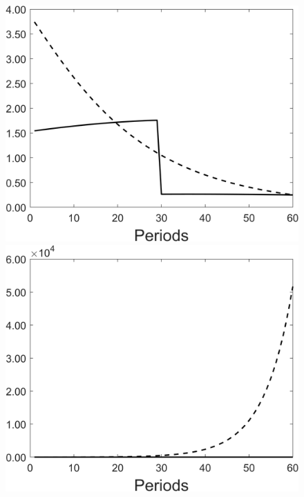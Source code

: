 \begin{figure}[h!!]
\begin{minipage}[]{0.32\textwidth}
	\end{minipage}
	\begin{minipage}[]{0.32\textwidth}
		\includegraphics[width=1\textwidth]{../codding_model/Own/figures/Rep_agent/staticRam_LF_separate_xc_periods59_eppsilon0.40_zeta1.40_Ad08_Ac04_thetac0.70_thetad0.56_HetGrowth1_tauul0.181_util0_withtarget1_lgd0.png}
	\end{minipage}
	\begin{minipage}[]{0.32\textwidth}
		\includegraphics[width=1\textwidth]{../codding_model/Own/figures/Rep_agent/staticRam_LF_separate_ydyc_periods59_eppsilon0.40_zeta1.40_Ad08_Ac04_thetac0.70_thetad0.56_HetGrowth1_tauul0.181_util0_withtarget1_lgd0.png}
	\end{minipage}
\end{figure}


